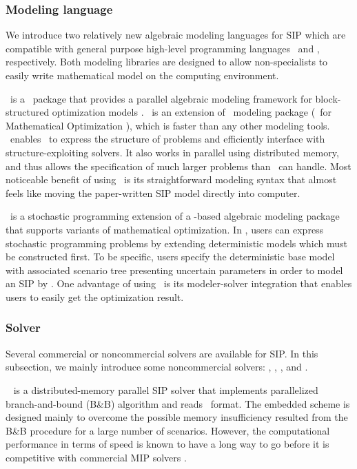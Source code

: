 \subsubsection{Modeling language}
We introduce two relatively new algebraic modeling languages for SIP which are compatible with general purpose high-level programming languages \julia\ and \python, respectively. Both modeling libraries are designed to allow non-specialists to easily write mathematical model on the computing environment.

\structjump\ is a \julia\ package that provides a parallel algebraic modeling framework for block-structured optimization models \cite{web:StructJuMP}. \structjump\ is an extension of \jump\ modeling package (\julia\ for Mathematical Optimization \cite{journal:JuMP}), which is faster than any other modeling tools. \structjump\ enables \jump\ to express the structure of problems and efficiently interface with structure-exploiting solvers. It also works in parallel using distributed memory, and thus allows the specification of much larger problems than \jump\ can handle. Most noticeable benefit of using \structjump\ is its straightforward modeling syntax that almost feels like moving the paper-written SIP model directly into computer.

\pysp\ is a stochastic programming extension of a \python-based algebraic modeling package \pyomo\ \cite{book:pyomo} that supports variants of mathematical optimization. In \pysp, users can express stochastic programming problems by extending deterministic models which must be constructed first. To be specific, users specify the deterministic base model with associated scenario tree presenting uncertain parameters in order to model an SIP by \pysp. One advantage of using \pysp\ is its modeler-solver integration that enables users to easily get the optimization result.

\subsubsection{Solver}
Several commercial or noncommercial solvers are available for SIP. In this subsection, we mainly introduce some noncommercial solvers: \pipssbb, \scip, \dsp, and \pysp.

\pipssbb\ \cite{web:PIPS-SBB} is a distributed-memory parallel SIP solver that implements parallelized branch-and-bound (B\&B) algorithm and reads \smps\ format. The embedded scheme is designed mainly to overcome the possible memory insufficiency resulted from the B\&B procedure for a large number of scenarios. However, the computational performance in terms of speed is known to have a long way to go before it is competitive with commercial MIP solvers \cite{proceeding:MOR2016}.

